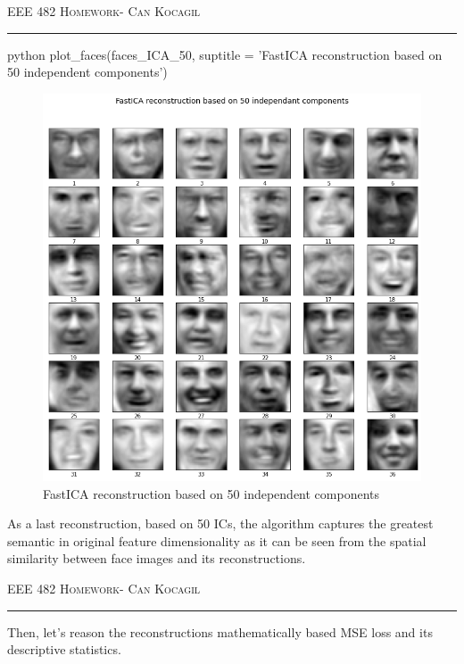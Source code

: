 \documentclass[12pt]{amsart}
\begin{document}
\newpage
{\scshape EEE 482} \hfill {\scshape \large  Homework-\relax} \hfill {\scshape Can Kocagil}
\smallskip
\hrule
\vspace{2mm}

\begin{mintedbox}{python}
plot_faces(faces_ICA_50, suptitle = 'FastICA reconstruction based on 50 independent components')
\end{mintedbox}

\begin{figure}[h]
    \centering
        \includegraphics[width = 1\textwidth]{images/Q1/FastICA reconstruction based on 50 independant components.png}
        \caption{FastICA reconstruction based on 50 independent components}
\end{figure}

As a last reconstruction, based on 50 ICs, the algorithm captures the greatest semantic in original feature dimensionality as it can be seen from the spatial similarity between face images and its reconstructions.


\newpage
{\scshape EEE 482} \hfill {\scshape \large  Homework-\relax} \hfill {\scshape Can Kocagil}
\smallskip
\hrule
\vspace{2mm}

Then, let's reason the reconstructions mathematically based MSE loss and its descriptive statistics.
\end{document}
